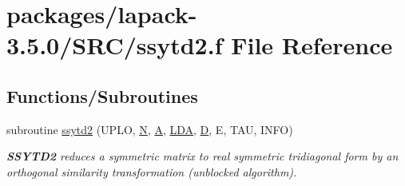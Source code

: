 \hypertarget{ssytd2_8f}{}\section{packages/lapack-\/3.5.0/\+S\+R\+C/ssytd2.f File Reference}
\label{ssytd2_8f}
\subsection*{Functions/\+Subroutines}
\begin{DoxyCompactItemize}
\item 
subroutine \hyperlink{group__realSYcomputational_gac702851ad871b3170b0566876fd588b1}{ssytd2} (U\+P\+L\+O, \hyperlink{polmisc_8c_a0240ac851181b84ac374872dc5434ee4}{N}, \hyperlink{classA}{A}, \hyperlink{example__user_8c_ae946da542ce0db94dced19b2ecefd1aa}{L\+D\+A}, \hyperlink{odrpack_8h_a7dae6ea403d00f3687f24a874e67d139}{D}, E, T\+A\+U, I\+N\+F\+O)
\begin{DoxyCompactList}\small\item\em {\bfseries S\+S\+Y\+T\+D2} reduces a symmetric matrix to real symmetric tridiagonal form by an orthogonal similarity transformation (unblocked algorithm). \end{DoxyCompactList}\end{DoxyCompactItemize}
